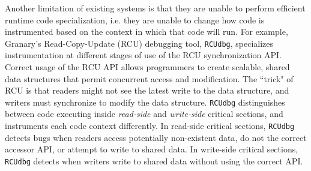 \documentclass[preprint]{sigplanconf}
\begin{document}
Another limitation of existing systems is that they are unable to perform efficient runtime code specialization, i.e. they are unable to change how code is instrumented based on the context in which that code will run. For example, Granary's Read-Copy-Update (RCU) debugging tool, \texttt{RCUdbg}, specializes instrumentation at different stages of use of the RCU synchronization API. Correct usage of the RCU API allows programmers to create scalable, shared data structures that permit concurrent access and modification. The ``trick" of RCU is that readers might not see the latest write to the data structure, and writers must synchronize to modify the data structure. \texttt{RCUdbg} distinguishes between code executing inside \emph{read-side} and \emph{write-side} critical sections, and instruments each code context differently. In read-side critical sections, \texttt{RCUdbg} detects bugs when readers access potentially non-existent data, do not the correct accessor API, or attempt to write to shared data. In write-side critical sections, \texttt{RCUdbg} detects when writers write to shared data without using the correct API. 




\end{document}
